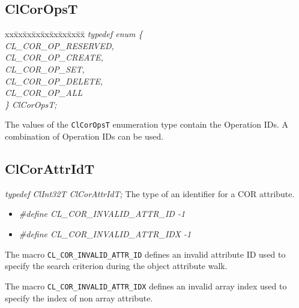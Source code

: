 \begin{flushleft}
\subsection{ClCorOpsT}
\label{corops}

\begin{tabbing}
xx\=xx\=xx\=xx\=xx\=xx\=xx\=xx\=xx\=\kill
\textit{typedef enum \{}\\
\>\>\>\>\textit{CL\_COR\_OP\_RESERVED,}\\
\>\>\>\>\textit{CL\_COR\_OP\_CREATE,}\\
\>\>\>\>\textit{CL\_COR\_OP\_SET,}\\
\>\>\>\>\textit{CL\_COR\_OP\_DELETE,}\\
\>\>\>\>\textit{CL\_COR\_OP\_ALL}\\
\textit{\} ClCorOpsT;}\end{tabbing}
The values of the {\tt{ClCorOpsT}} enumeration type contain the Operation IDs. A combination of Operation IDs can be used.



\subsection{ClCorAttrIdT}
\textit{typedef ClInt32T ClCorAttrIdT;}
\newline
\newline
The type of an identifier for a COR attribute.
\begin{itemize}
\item
\textit{\#define CL\_\-COR\_\-INVALID\_\-ATTR\_\-ID         -1}
\item
\textit{\#define CL\_\-COR\_\-INVALID\_\-ATTR\_\-IDX        -1}
\end{itemize}

The macro {\tt{CL\_\-COR\_\-INVALID\_\-ATTR\_\-ID}} defines an invalid attribute ID used to specify the search criterion during the object 
attribute walk.

The macro {\tt{CL\_\-COR\_\-INVALID\_\-ATTR\_\-IDX}} defines an invalid array index used to specify the index of non array attribute.



\end{flushleft}
